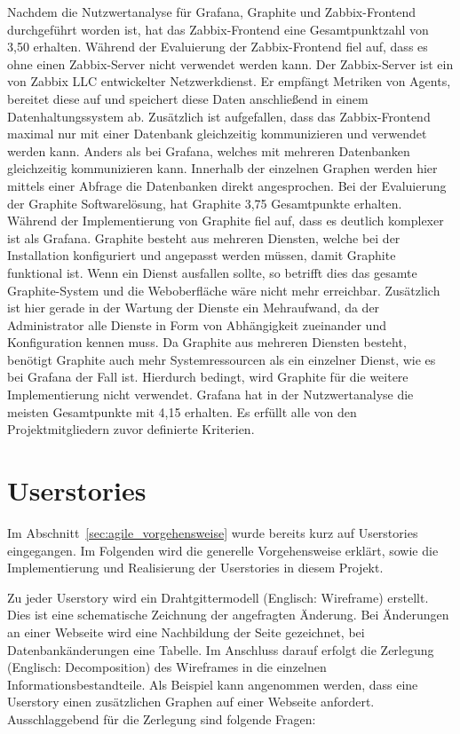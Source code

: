 Nachdem die Nutzwertanalyse für Grafana, Graphite und Zabbix\hyp{}Frontend
durchgeführt worden ist, hat das Zabbix\hyp{}Frontend eine Gesamtpunktzahl von
3,50 erhalten. Während der Evaluierung der Zabbix\hyp{}Frontend fiel auf, dass
es ohne einen Zabbix\hyp{}Server nicht verwendet werden kann. Der
Zabbix\hyp{}Server ist ein von Zabbix LLC entwickelter Netzwerkdienst. Er
empfängt Metriken von Agents, bereitet diese auf und speichert diese Daten
anschließend in einem Datenhaltungssystem ab. Zusätzlich ist aufgefallen, dass
das Zabbix\hyp{}Frontend maximal nur mit einer Datenbank gleichzeitig
kommunizieren und verwendet werden kann. Anders als bei Grafana, welches mit
mehreren Datenbanken gleichzeitig kommunizieren kann. Innerhalb der einzelnen
Graphen werden hier mittels einer Abfrage die Datenbanken direkt angesprochen.
Bei der Evaluierung der Graphite Softwarelösung, hat Graphite 3,75 Gesamtpunkte
erhalten. Während der Implementierung von Graphite fiel auf, dass es deutlich
komplexer ist als Grafana. Graphite besteht aus mehreren Diensten, welche bei
der Installation konfiguriert und angepasst werden müssen, damit Graphite
funktional ist. Wenn ein Dienst ausfallen sollte, so betrifft dies das gesamte
Graphite\hyp{}System und die Weboberfläche wäre nicht mehr erreichbar.
Zusätzlich ist hier gerade in der Wartung der Dienste ein Mehraufwand, da der
Administrator alle Dienste in Form von Abhängigkeit zueinander und
Konfiguration kennen muss. Da Graphite aus mehreren Diensten besteht, benötigt
Graphite auch mehr Systemressourcen als ein einzelner Dienst, wie es bei
Grafana der Fall ist. Hierdurch bedingt, wird Graphite für die weitere
Implementierung nicht verwendet. Grafana hat in der Nutzwertanalyse die meisten
Gesamtpunkte mit 4,15 erhalten. Es erfüllt alle von den Projektmitgliedern
zuvor definierte Kriterien.
\mr%

\chapter{Userstories}
Im Abschnitt~\ref{sec:agile_vorgehensweise} wurde bereits kurz auf Userstories
eingegangen. Im Folgenden wird die generelle Vorgehensweise erklärt, sowie die
Implementierung und Realisierung der Userstories in diesem Projekt.

Zu jeder Userstory wird ein Drahtgittermodell (Englisch: Wireframe) erstellt.
Dies ist eine schematische Zeichnung der angefragten Änderung. Bei Änderungen
an einer Webseite wird eine Nachbildung der Seite gezeichnet, bei
Datenbankänderungen eine Tabelle. Im Anschluss darauf erfolgt die Zerlegung
(Englisch: Decomposition) des Wireframes in die einzelnen
Informationsbestandteile. Als Beispiel kann angenommen werden, dass eine
Userstory einen zusätzlichen Graphen auf einer Webseite anfordert.
Ausschlaggebend für die Zerlegung sind folgende Fragen:

